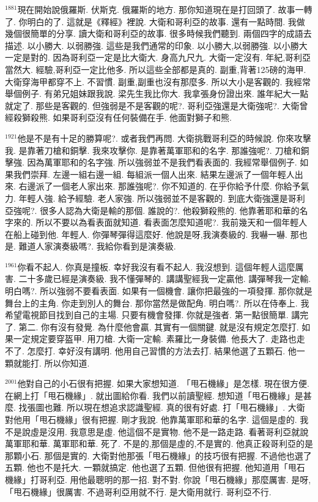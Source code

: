 \documentclass{book}
\begin{document}
$^{1881}$現在開始說俄羅斯.
伏斯克.
俄羅斯的地方.
那你知道現在是打回頭了.
故事一轉了.
你明白的了.
這就是《釋經》裡說.
大衛和哥利亞的故事.
還有一點時間.
我做幾個很簡單的分享.
讀大衛和哥利亞的故事.
很多時候我們聽到.
兩個四字的成語去描述.
以小勝大.
以弱勝強.
這些是我們通常的印象.
以小勝大,以弱勝強.
以小勝大一定是對的.
因為哥利亞一定是比大衛大.
身高九尺九.
大衛一定沒有.
年紀,哥利亞當然大.
經驗,哥利亞一定比他多.
所以這些全部都是真的.
副重,背著125磅的海甲.
大衛穿海甲都穿不上.
不習慣.
副重,副重也沒有那麼多.
所以大小是客觀的.
我經常舉個例子.
有弟兄姐妹跟我說.
梁先生我比你大.
我拿張身份證出來.
誰年紀大一點就定了.
那些是客觀的.
但強弱是不是客觀的呢?.
哥利亞強還是大衛強呢?.
大衛曾經殺獅殺熊.
如果哥利亞沒有任何裝備在手.
他面對獅子和熊.

$^{1921}$他是不是有十足的勝算呢?.
或者我們再問.
大衛挑戰哥利亞的時候說.
你來攻擊我.
是靠著刀槍和銅擊.
我來攻擊你.
是靠著萬軍耶和的名字.
那誰強呢?.
刀槍和銅擊強.
因為萬軍耶和的名字強.
所以強弱並不是我們看表面的.
我經常舉個例子.
如果我們崇拜.
左邊一組右邊一組.
每組派一個人出來.
結果左邊派了一個年輕人出來.
右邊派了一個老人家出來.
那誰強呢?.
你不知道的.
在乎你給予什麼.
你給予氣力.
年輕人強.
給予經驗.
老人家強.
所以強弱並不是客觀的.
到底大衛強還是哥利亞強呢?.
很多人認為大衛是輸的那個.
誰說的?.
他殺獅殺熊的.
他靠著耶和華的名字來的.
所以不要以為看表面就知道.
看表面怎麼知道呢?.
我前幾天和一個年輕人在船上碰到他.
年輕人.
你彈琴彈得這麼好.
他說是呀,我演奏級的.
我嚇一嚇.
那也是.
難道人家演奏級嗎?.
我給你看到是演奏級.

$^{1961}$你看不起人.
你真是撞板.
幸好我沒有看不起人.
我沒想到.
這個年輕人這麼厲害.
二十多歲已經是演奏級.
我不懂彈琴的.
講講聖經我一定贏他.
講彈琴我一定輸.
明白嗎?.
所以強弱不要看表面.
如果有一個機會.
讓你把最強的一項發揮.
那你就是舞台上的主角.
你走到別人的舞台.
那你當然是做配角.
明白嗎?.
所以在侍奉上.
我希望電視節目找到自己的主場.
只要有機會發揮.
你就是強者.
第一點很簡單.
講完了.
第二.
你有沒有發覺.
為什麼他會贏.
其實有一個關鍵.
就是沒有規定怎麼打.
如果一定規定要穿盔甲.
用刀槍.
大衛一定輸.
素羅比一身裝備.
他長大了.
走路也走不了.
怎麼打.
幸好沒有講明.
他用自己習慣的方法去打.
結果他選了五顆石.
他一顆就能打.
所以你知道.

$^{2001}$他對自己的小石很有把握.
如果大家想知道.
「甩石機緣」是怎樣.
現在很方便.
在網上打「甩石機緣」.
就出圖給你看.
我們以前讀聖經.
想知道「甩石機緣」是甚麼.
找張圖也難.
所以現在想追求認識聖經.
真的很有好處.
打「甩石機緣」.
大衛對他用「甩石機緣」很有把握.
剛才我說.
他靠萬軍耶和華的名字.
這個是虛的.
我不是說虛是沒用.
我意思是虛.
他這個不是實物.
他不是一路走路.
看著哥利亞就說萬軍耶和華.
萬軍耶和華.
死了.
不是的,那個是虛的,不是實的.
他真正殺哥利亞的是那顆小石.
那個是實的.
大衛對他那張「甩石機緣」的技巧很有把握.
不過他也選了五顆.
他也不是托大.
一顆就搞定.
他也選了五顆.
但他很有把握.
他知道用「甩石機緣」打哥利亞.
用他最聰明的那一招.
對不對.
你說「甩石機緣」那麼厲害.
是呀,「甩石機緣」很厲害.
不過哥利亞用就不行.
是大衛用就行.
哥利亞不行.
\end{document}
